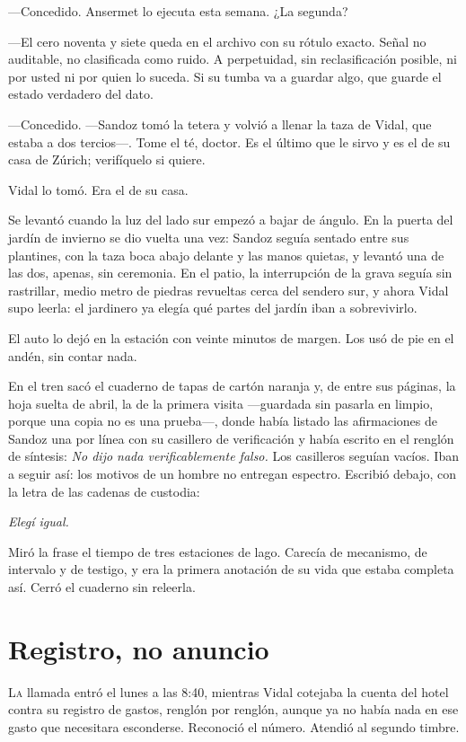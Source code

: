 ---Concedido. Ansermet lo ejecuta esta semana. ¿La segunda?

---El cero noventa y siete queda en el archivo con su rótulo exacto. Señal no auditable, no clasificada como ruido. A perpetuidad, sin reclasificación posible, ni por usted ni por quien lo suceda. Si su tumba va a guardar algo, que guarde el estado verdadero del dato.

---Concedido. ---Sandoz tomó la tetera y volvió a llenar la taza de Vidal, que estaba a dos tercios---. Tome el té, doctor. Es el último que le sirvo y es el de su casa de Zúrich; verifíquelo si quiere.

Vidal lo tomó. Era el de su casa.

Se levantó cuando la luz del lado sur empezó a bajar de ángulo. En la puerta del jardín de invierno se dio vuelta una vez: Sandoz seguía sentado entre sus plantines, con la taza boca abajo delante y las manos quietas, y levantó una de las dos, apenas, sin ceremonia. En el patio, la interrupción de la grava seguía sin rastrillar, medio metro de piedras revueltas cerca del sendero sur, y ahora Vidal supo leerla: el jardinero ya elegía qué partes del jardín iban a sobrevivirlo.

El auto lo dejó en la estación con veinte minutos de margen. Los usó de pie en el andén, sin contar nada.

En el tren sacó el cuaderno de tapas de cartón naranja y, de entre sus páginas, la hoja suelta de abril, la de la primera visita ---guardada sin pasarla en limpio, porque una copia no es una prueba---, donde había listado las afirmaciones de Sandoz una por línea con su casillero de verificación y había escrito en el renglón de síntesis: \textit{No dijo nada verificablemente falso.} Los casilleros seguían vacíos. Iban a seguir así: los motivos de un hombre no entregan espectro. Escribió debajo, con la letra de las cadenas de custodia:

\textit{Elegí igual.}

Miró la frase el tiempo de tres estaciones de lago. Carecía de mecanismo, de intervalo y de testigo, y era la primera anotación de su vida que estaba completa así. Cerró el cuaderno sin releerla.

\clearpage

\chapter{Registro, no anuncio}

\lettrine[lines=2, lhang=0.1, nindent=0.2em]{L}{a} llamada entró el lunes a las 8:40, mientras Vidal cotejaba la cuenta del hotel contra su registro de gastos, renglón por renglón, aunque ya no había nada en ese gasto que necesitara esconderse. Reconoció el número. Atendió al segundo timbre.


